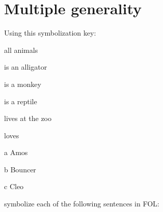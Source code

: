 \chapter{Multiple generality}\setcounter{ProbPart}{0}
\problempart
Using this symbolization key:
\begin{ekey}
\item[\text{domain}] all animals
\item[\atom{A}{x}]  is an alligator
\item[\atom{M}{x}]  is a monkey
\item[\atom{R}{x}]  is a reptile
\item[\atom{Z}{x}]  lives at the zoo
\item[\atom{L}{x,y}]  loves 
\item[a] Amos
\item[b] Bouncer
\item[c] Cleo
\end{ekey}
symbolize each of the following sentences in FOL:
